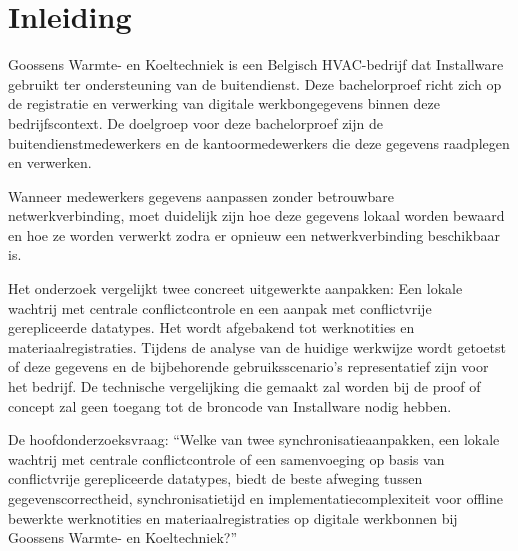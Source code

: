 


% 

\section{Inleiding}%
\label{sec:inleiding}

Goossens Warmte- en Koeltechniek is een Belgisch HVAC-bedrijf dat Installware gebruikt ter ondersteuning van de buitendienst.
Deze bachelorproef richt zich op de registratie en verwerking van digitale werkbongegevens binnen deze bedrijfscontext.
De doelgroep voor deze bachelorproef zijn de buitendienstmedewerkers en de kantoormedewerkers die deze gegevens
raadplegen en verwerken.

Wanneer medewerkers gegevens aanpassen zonder betrouwbare netwerkverbinding,
moet duidelijk zijn hoe deze gegevens lokaal worden bewaard en hoe ze worden
verwerkt zodra er opnieuw een netwerkverbinding beschikbaar is.

Het onderzoek vergelijkt twee concreet uitgewerkte aanpakken:
Een lokale wachtrij met centrale conflictcontrole en een aanpak met conflictvrije gerepliceerde datatypes.
Het wordt afgebakend tot werknotities en materiaalregistraties. Tijdens de analyse van de huidige werkwijze
wordt getoetst of deze gegevens en de bijbehorende gebruiksscenario’s representatief zijn voor het bedrijf.
De technische vergelijking die gemaakt zal worden bij de proof of concept zal geen toegang tot de
broncode van Installware nodig hebben.

De hoofdonderzoeksvraag: “Welke van twee synchronisatieaanpakken, een lokale wachtrij met centrale conflictcontrole of een samenvoeging op basis van conflictvrije gerepliceerde datatypes, biedt de beste afweging tussen gegevenscorrectheid, synchronisatietijd en implementatiecomplexiteit voor offline bewerkte werknotities en materiaalregistraties op digitale werkbonnen bij Goossens Warmte- en Koeltechniek?”


